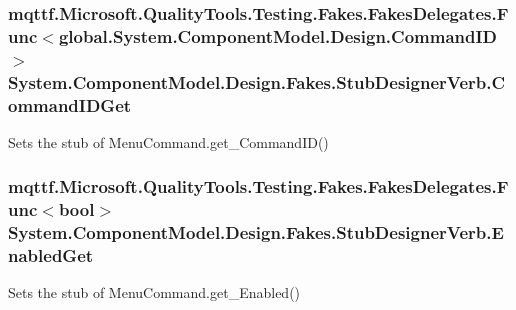 \hypertarget{class_system_1_1_component_model_1_1_design_1_1_fakes_1_1_stub_designer_verb_ae9c5d2cc11b9b7bde906e83604fb4ee4}{
\subsubsection[{Command\-I\-D\-Get}]{\setlength{\rightskip}{0pt plus 5cm}mqttf.\-Microsoft.\-Quality\-Tools.\-Testing.\-Fakes.\-Fakes\-Delegates.\-Func$<$global.\-System.\-Component\-Model.\-Design.\-Command\-I\-D$>$ System.\-Component\-Model.\-Design.\-Fakes.\-Stub\-Designer\-Verb.\-Command\-I\-D\-Get}}\label{class_system_1_1_component_model_1_1_design_1_1_fakes_1_1_stub_designer_verb_ae9c5d2cc11b9b7bde906e83604fb4ee4}


Sets the stub of Menu\-Command.\-get\-\_\-\-Command\-I\-D()

\hypertarget{class_system_1_1_component_model_1_1_design_1_1_fakes_1_1_stub_designer_verb_ae958ba039a53cee5e3bc63825d40c3bb}{
\subsubsection[{Enabled\-Get}]{\setlength{\rightskip}{0pt plus 5cm}mqttf.\-Microsoft.\-Quality\-Tools.\-Testing.\-Fakes.\-Fakes\-Delegates.\-Func$<$bool$>$ System.\-Component\-Model.\-Design.\-Fakes.\-Stub\-Designer\-Verb.\-Enabled\-Get}}\label{class_system_1_1_component_model_1_1_design_1_1_fakes_1_1_stub_designer_verb_ae958ba039a53cee5e3bc63825d40c3bb}


Sets the stub of Menu\-Command.\-get\-\_\-\-Enabled()

